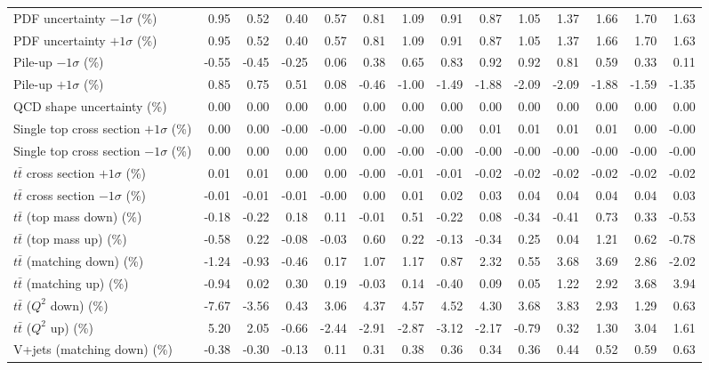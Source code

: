 \begin{table}[htbp]
{\begin{tabular}{lrrrrrrrrrrrrr}
PDF uncertainty $-1\sigma$ (\%) & 0.95 & 0.52 & 0.40 & 0.57 & 0.81 & 1.09 & 0.91 & 0.87 & 1.05 & 1.37 & 1.66 & 1.70 & 1.63 \\ 
PDF uncertainty $+1\sigma$ (\%) & 0.95 & 0.52 & 0.40 & 0.57 & 0.81 & 1.09 & 0.91 & 0.87 & 1.05 & 1.37 & 1.66 & 1.70 & 1.63 \\ 
Pile-up $-1\sigma$ (\%) & -0.55 & -0.45 & -0.25 & 0.06 & 0.38 & 0.65 & 0.83 & 0.92 & 0.92 & 0.81 & 0.59 & 0.33 & 0.11 \\ 
Pile-up $+1\sigma$ (\%) & 0.85 & 0.75 & 0.51 & 0.08 & -0.46 & -1.00 & -1.49 & -1.88 & -2.09 & -2.09 & -1.88 & -1.59 & -1.35 \\ 
QCD shape uncertainty (\%) & 0.00 & 0.00 & 0.00 & 0.00 & 0.00 & 0.00 & 0.00 & 0.00 & 0.00 & 0.00 & 0.00 & 0.00 & 0.00 \\ 
Single top cross section $+1\sigma$ (\%) & 0.00 & 0.00 & -0.00 & -0.00 & -0.00 & -0.00 & 0.00 & 0.01 & 0.01 & 0.01 & 0.01 & 0.00 & -0.00 \\ 
Single top cross section $-1\sigma$ (\%) & 0.00 & 0.00 & 0.00 & 0.00 & 0.00 & -0.00 & -0.00 & -0.00 & -0.00 & -0.00 & -0.00 & -0.00 & -0.00 \\ 
$t\bar{t}$ cross section $+1\sigma$ (\%) & 0.01 & 0.01 & 0.00 & 0.00 & -0.00 & -0.01 & -0.01 & -0.02 & -0.02 & -0.02 & -0.02 & -0.02 & -0.02 \\ 
$t\bar{t}$ cross section $-1\sigma$ (\%) & -0.01 & -0.01 & -0.01 & -0.00 & 0.00 & 0.01 & 0.02 & 0.03 & 0.04 & 0.04 & 0.04 & 0.04 & 0.03 \\ 
$t\bar{t}$ (top mass down) (\%) & -0.18 & -0.22 & 0.18 & 0.11 & -0.01 & 0.51 & -0.22 & 0.08 & -0.34 & -0.41 & 0.73 & 0.33 & -0.53 \\ 
$t\bar{t}$ (top mass up) (\%) & -0.58 & 0.22 & -0.08 & -0.03 & 0.60 & 0.22 & -0.13 & -0.34 & 0.25 & 0.04 & 1.21 & 0.62 & -0.78 \\ 
$t\bar{t}$ (matching down) (\%) & -1.24 & -0.93 & -0.46 & 0.17 & 1.07 & 1.17 & 0.87 & 2.32 & 0.55 & 3.68 & 3.69 & 2.86 & -2.02 \\ 
$t\bar{t}$ (matching up) (\%) & -0.94 & 0.02 & 0.30 & 0.19 & -0.03 & 0.14 & -0.40 & 0.09 & 0.05 & 1.22 & 2.92 & 3.68 & 3.94 \\ 
$t\bar{t}$ ($Q^{2}$ down) (\%) & -7.67 & -3.56 & 0.43 & 3.06 & 4.37 & 4.57 & 4.52 & 4.30 & 3.68 & 3.83 & 2.93 & 1.29 & 0.63 \\ 
$t\bar{t}$ ($Q^{2}$ up) (\%) & 5.20 & 2.05 & -0.66 & -2.44 & -2.91 & -2.87 & -3.12 & -2.17 & -0.79 & 0.32 & 1.30 & 3.04 & 1.61 \\ 
V+jets (matching down) (\%) & -0.38 & -0.30 & -0.13 & 0.11 & 0.31 & 0.38 & 0.36 & 0.34 & 0.36 & 0.44 & 0.52 & 0.59 & 0.63 \\ 

\end{tabular}}
\end{table}
